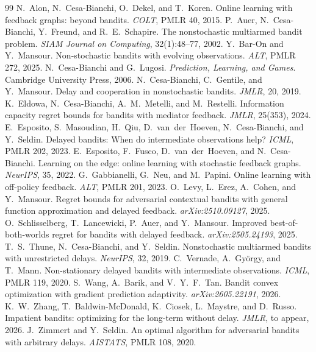 \documentclass{article}
\theoremstyle{remark}
\begin{document}
\begin{thebibliography}{99}
 N.~Alon, N.~Cesa-Bianchi, O.~Dekel, and T.~Koren. Online learning with feedback graphs: beyond bandits. \emph{COLT}, PMLR 40, 2015.
 P.~Auer, N.~Cesa-Bianchi, Y.~Freund, and R.~E.~Schapire. The nonstochastic multiarmed bandit problem. \emph{SIAM Journal on Computing}, 32(1):48--77, 2002.
 Y.~Bar-On and Y.~Mansour. Non-stochastic bandits with evolving observations. \emph{ALT}, PMLR 272, 2025.
 N.~Cesa-Bianchi and G.~Lugosi. \emph{Prediction, Learning, and Games}. Cambridge University Press, 2006.
 N.~Cesa-Bianchi, C.~Gentile, and Y.~Mansour. Delay and cooperation in nonstochastic bandits. \emph{JMLR}, 20, 2019.
 K.~Eldowa, N.~Cesa-Bianchi, A.~M.~Metelli, and M.~Restelli. Information capacity regret bounds for bandits with mediator feedback. \emph{JMLR}, 25(353), 2024.
 E.~Esposito, S.~Masoudian, H.~Qiu, D.~van~der~Hoeven, N.~Cesa-Bianchi, and Y.~Seldin. Delayed bandits: When do intermediate observations help? \emph{ICML}, PMLR 202, 2023.
 E.~Esposito, F.~Fusco, D.~van~der~Hoeven, and N.~Cesa-Bianchi. Learning on the edge: online learning with stochastic feedback graphs. \emph{NeurIPS}, 35, 2022.
 G.~Gabbianelli, G.~Neu, and M.~Papini. Online learning with off-policy feedback. \emph{ALT}, PMLR 201, 2023.
 O.~Levy, L.~Erez, A.~Cohen, and Y.~Mansour. Regret bounds for adversarial contextual bandits with general function approximation and delayed feedback. \emph{arXiv:2510.09127}, 2025.
 O.~Schlisselberg, T.~Lancewicki, P.~Auer, and Y.~Mansour. Improved best-of-both-worlds regret for bandits with delayed feedback. \emph{arXiv:2505.24193}, 2025.
 T.~S.~Thune, N.~Cesa-Bianchi, and Y.~Seldin. Nonstochastic multiarmed bandits with unrestricted delays. \emph{NeurIPS}, 32, 2019.
 C.~Vernade, A.~Gy\"orgy, and T.~Mann. Non-stationary delayed bandits with intermediate observations. \emph{ICML}, PMLR 119, 2020.
 S.~Wang, A.~Barik, and V.~Y.~F.~Tan. Bandit convex optimization with gradient prediction adaptivity. \emph{arXiv:2605.22191}, 2026.
 K.~W.~Zhang, T.~Baldwin-McDonald, K.~Ciosek, L.~Maystre, and D.~Russo. Impatient bandits: optimizing for the long-term without delay. \emph{JMLR}, to appear, 2026.
 J.~Zimmert and Y.~Seldin. An optimal algorithm for adversarial bandits with arbitrary delays. \emph{AISTATS}, PMLR 108, 2020.
\end{thebibliography}
\end{document}
